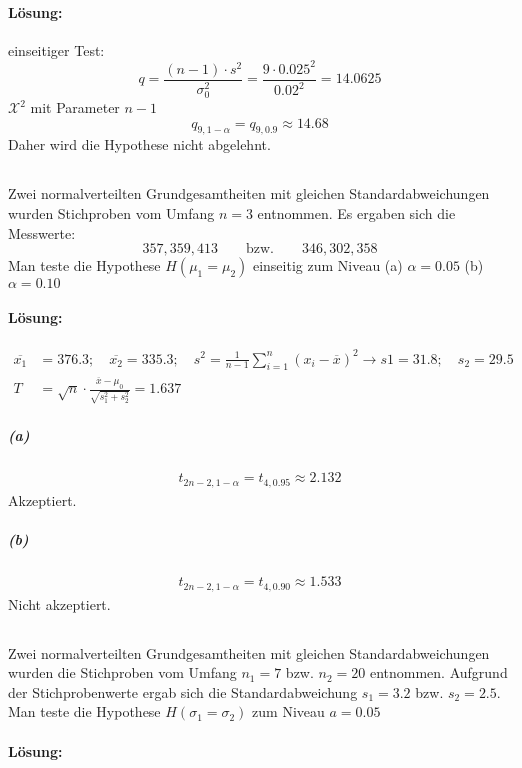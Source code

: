 \documentclass[ngerman]{scrartcl}
\begin{document}
\paragraph{Lösung:}
einseitiger Test:
\begin{equation*}
q = \frac{(n-1)\cdot s^2}{\sigma_0^2} = \frac{9 \cdot 0.025^2}{0.02^2} = 14.0625
\end{equation*}
$\mathcal{X}^2$ mit Parameter $n-1$\[
q_{9,1-\alpha} = q_{9,0.9}\approx 14.68\]
Daher wird die Hypothese nicht abgelehnt.

\subsection{}
Zwei normalverteilten Grundgesamtheiten mit gleichen Standardabweichungen wurden Stichproben vom Umfang $n=3$ entnommen. Es ergaben sich die Messwerte:\[
357,359,413\qquad \text{bzw.}\qquad 346,302,358
\]
Man teste die Hypothese $H(\mu_1 = \mu_2)$ einseitig zum Niveau (a) $\alpha =0.05$ (b) $\alpha= 0.10$
\paragraph{Lösung:}
\begin{align*}
\overline{x_1} &= 376.3;\quad \overline{x_2} = 335.3;\quad s^2=\frac{1}{n-1}\sum_{i=1}^{n}\left(x_i - \overline{x}\right)^2\rightarrow s1 = 31.8;\quad s_2 = 29.5\\
 T &= \sqrt{n}\cdot \frac{\overline{x} - \mu_0}{\sqrt{s_1^2 + s_2^2}} = 1.637
\end{align*}
\subparagraph{(a)}
\begin{align*}
t_{2n-2, 1-\alpha} = t_{4, 0.95}\approx 2.132
\end{align*}
Akzeptiert.
\subparagraph{(b)}
\begin{align*}
t_{2n-2, 1-\alpha} = t_{4, 0.90}\approx 1.533
\end{align*}
Nicht akzeptiert.
\subsection{}
Zwei normalverteilten Grundgesamtheiten mit gleichen Standardabweichungen wurden die Stichproben vom Umfang $n_1 = 7$ bzw. $n_2 = 20$ entnommen. Aufgrund der Stichprobenwerte ergab sich die Standardabweichung $s_1 = 3.2$ bzw. $s_2 = 2.5$. Man teste die Hypothese $H(\sigma_1 = \sigma_2)$ zum Niveau $a = 0.05$
\paragraph{Lösung:}
\end{document}
